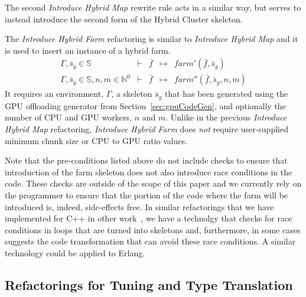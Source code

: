 \documentclass[final]{jfp1}
\newcommand{\f}[0]{\bar{f}}
\newcommand{\s}[0]{\bar{s}}
\newcommand{\bs}[0]{\mathbb{S}}
\newcommand{\bn}[0]{\mathbb{N}}
\newcommand{\bnz}[0]{\bn^{0}}
\newcommand{\rewrite}[3]{#1 & \vdash{} & #2 & \mapsto{} & #3}
\begin{document}
%
The second \emph{Introduce Hybrid Map} rewrite rule
acts in a similar way, but serves to instead introduce the second form of the
Hybrid Cluster skeleton.

The \emph{Introduce Hybrid Farm} refactoring is
similar to \emph{Introduce Hybrid Map} and it is used to insert an instance of a hybrid farm.
% 
\[
\begin{array}{rclcl}
  \rewrite{\Gamma, \s_g \in \bs}{\f}{farm'(\f, \s_g)} \\
  \rewrite{\Gamma, \s_g \in \bs, n,m \in \bnz}{\f}{farm''(\f, \s_g, n, m)}
\end{array}
\]
% 
\noindent
It requires an environment, $\Gamma$, a skeleton $\s_g$ that has been generated using the GPU offloading generator from Section~\ref{sec:gpuCodeGen}, and optionally the number of CPU and GPU workers, $n$ and $m$. Unlike in the previous \emph{Introduce Hybrid Map} refactoring, \emph{Introduce Hybrid Farm} does \emph{not} require user-supplied
minimum chunk size or CPU to GPU ratio values.

Note that the pre-conditions listed above do not include checks to ensure that introduction of the farm skeleton does not also introduce race conditions in the code. These checks are outside of the scope of this paper and we currently rely on the programmer to ensure that the portion of the code where the farm will be introduced is, indeed, side-effects free. In similar refactorings that we have implemented for C++ in other work~\cite{paraformance}, we have a technolgy that checks for race conditions in loops that are turned into skeletons and, furthermore, in some cases suggests the code transformation that can avoid these race conditions. A similar technology could be applied to Erlang.


\subsection{Refactorings for Tuning and Type Translation}
\label{sec:shaping}
\label{sect:progshaping}
\end{document}
